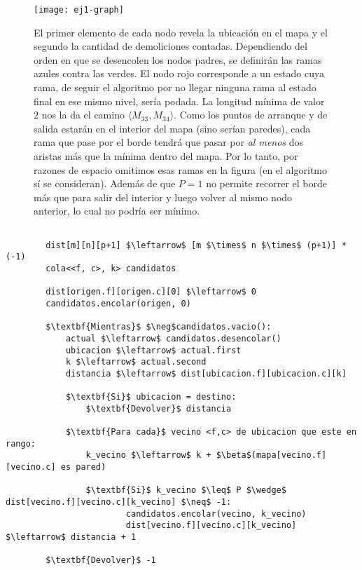     \begin{figure}[H]
        \centering
        \texttt{[image: ej1-graph]}
        \caption{El primer elemento de cada nodo revela la ubicación en el mapa y el segundo la cantidad de demoliciones contadas. Dependiendo del orden en que se desencolen los nodos padres, se definirán las ramas azules contra las verdes. El nodo rojo corresponde a un estado cuya rama, de seguir el algoritmo por no llegar ninguna rama al estado final en ese mismo nivel, sería podada. La longitud mínima de valor $2$ nos la da el camino $\langle {M_{33}, M_{34}} \rangle$. Como los puntos de arranque y de salida estarán en el interior del mapa (sino serían paredes), cada rama que pase por el borde tendrá que pasar por \emph{al menos} dos aristas más que la mínima dentro del mapa. Por lo tanto, por razones de espacio omitimos esas ramas en la figura (en el algoritmo sí se consideran). Además de que $P=1$ no permite recorrer el borde más que para salir del interior y luego volver al mismo nodo anterior, lo cual no podría ser mínimo.}
        \label{fig:ej1-graph}
    \end{figure}

    \begin{lstlisting}[caption={Pseudoc\'odigo de la resoluci\'on. En 'candidatos' se guardan los nodos tentativos que quedan por visitar. En dist se guarda la menor distancia que tienen al origen que, por iterar haciendo BFS, es la del primer camino en alcanzar dicho nodo.}]

        dist[m][n][p+1] $\leftarrow$ [m $\times$ n $\times$ (p+1)] * (-1)
        cola<<f, c>, k> candidatos

        dist[origen.f][origen.c][0] $\leftarrow$ 0
        candidatos.encolar(origen, 0)

        $\textbf{Mientras}$ $\neg$candidatos.vacio():
            actual $\leftarrow$ candidatos.desencolar()
            ubicacion $\leftarrow$ actual.first
            k $\leftarrow$ actual.second
            distancia $\leftarrow$ dist[ubicacion.f][ubicacion.c][k]

            $\textbf{Si}$ ubicacion = destino:
                $\textbf{Devolver}$ distancia

            $\textbf{Para cada}$ vecino <f,c> de ubicacion que este en rango:
                k_vecino $\leftarrow$ k + $\beta$(mapa[vecino.f][vecino.c] es pared)

                $\textbf{Si}$ k_vecino $\leq$ P $\wedge$ dist[vecino.f][vecino.c][k_vecino] $\neq$ -1:
                        candidatos.encolar(vecino, k_vecino)
                        dist[vecino.f][vecino.c][k_vecino] $\leftarrow$ distancia + 1

        $\textbf{Devolver}$ -1
    \end{lstlisting}


